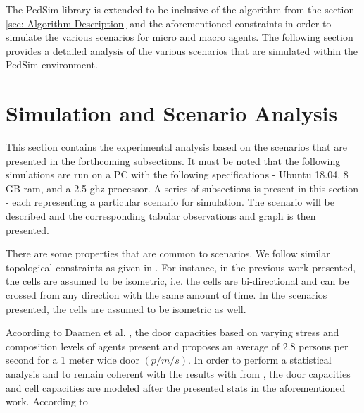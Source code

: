 The PedSim library is extended to be inclusive of the algorithm from the section \ref{sec: Algorithm Description} and the aforementioned constraints in order to simulate the various scenarios for micro and macro agents. The following section provides a detailed analysis of the various scenarios that are simulated within the PedSim environment.  

\section{Simulation and Scenario Analysis}
\label{sec: Simulation and Scenario Analysis}

This section contains the experimental analysis based on the scenarios that are presented in the forthcoming subsections. It must be noted that the following simulations are run on a PC with the following specifications - Ubuntu 18.04, 8 GB ram, and a 2.5 ghz processor. A series of subsections is present in this section - each representing a particular scenario for simulation. The scenario will be described and the corresponding tabular observations and graph is then presented. 

There are some properties that are common to scenarios. We follow similar topological constraints as given in \cite{ref5}. For instance, in the previous work presented, the cells are assumed to be isometric, i.e. the cells are bi-directional and can be crossed from any direction with the same amount of time. In the scenarios presented, the cells are assumed to be isometric as well.

Acoording to Daamen et al. \cite{ref23}, the door capacities based on varying stress and composition levels of agents present and proposes an average of 2.8 persons per second for a 1 meter wide door $(p/m/s)$. 
In order to perform a statistical analysis and to remain coherent with the results with from \cite{ref5}, the door capacities and cell capacities are modeled after the presented stats in the aforementioned work. According to 

\subsection{}
\label{sec: Simulation and Scenario Analysis}